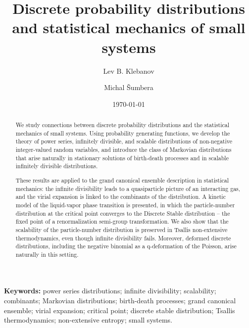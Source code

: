 \documentclass[a4paper,12pt]{amsart}
\theoremstyle{definition}
\theoremstyle{remark}
\begin{document}
\title[Discrete distributions and 
statistical mechanics of small systems]{Discrete probability distributions and 
statistical mechanics of small systems}
\author[L.B. Klebanov]{Lev B. Klebanov}
\address{Department of Probability and Mathematical Statistics, Faculty of Mathematics and Physics, Charles University, Sokolovská 49/83, 186 75 Prague, Czech Republic}
\author[M. \v{S}umbera]{Michal \v{S}umbera}
\address{Nuclear Physics Institute, Czech Academy of Sciences, 25068 \v{R}e\v{z}, Czech Republic}

\date{\today}

\begin{abstract}
We study connections between discrete probability distributions and the statistical mechanics of small systems. Using probability generating functions, we develop the theory of power series, infinitely divisible, and scalable distributions of non-negative integer-valued random variables, and introduce the class of Markovian distributions that arise naturally in stationary solutions of birth-death processes and in scalable infinitely divisible distributions. 

These results are applied to the grand canonical ensemble description in statistical mechanics: the infinite divisibility leads to a quasiparticle picture of an interacting gas, and the virial expansion is linked to the combinants of the distribution. A kinetic model of the liquid-vapor phase transition is presented, in which the particle-number distribution at the critical point converges to the Discrete Stable distribution -- the fixed point of a renormalization semi-group transformation. We also show that the scalability of the particle-number distribution is preserved in Tsallis non-extensive thermodynamics, even though infinite divisibility fails. Moreover, deformed discrete distributions, including the negative binomial as a q-deformation of the Poisson, arise naturally in this setting.
\end{abstract}


\maketitle
{\bf Keywords:} power series distributions; infinite divisibility; scalability; combinants; Markovian distributions; birth-death processes; grand canonical ensemble; virial expansion; critical point; discrete stable distribution; Tsallis thermodynamics; non-extensive entropy; small systems.
\newpage
\end{document}
